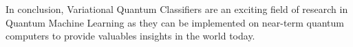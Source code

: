\documentclass[11pt]{article}
\begin{document}
In conclusion, Variational Quantum Classifiers are an exciting field of research in Quantum Machine Learning as they can be implemented on near-term quantum computers to provide
valuables insights in the world today.

\newpage

\end{document}
